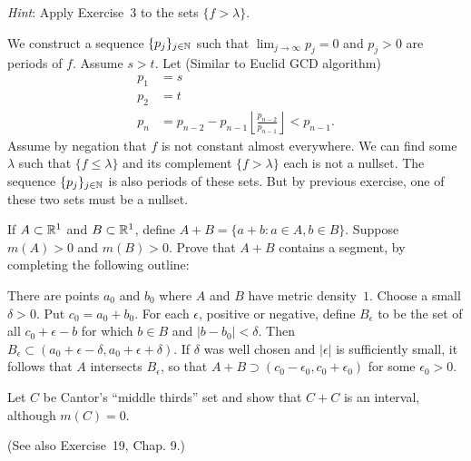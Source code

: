 \begin{enumerate}
\begin{excopy}
\emph{Hint}: Apply Exercise~3 to the sets \(\{f>\lambda\}\).
\end{excopy}

We construct a sequence \(\{p_j\}_{j\in\mathbb{N}}\) such that 
\(\lim_{j\to\infty} p_j = 0\) and \(p_j > 0\) are periods of $f$.
Assume \(s>t\). Let (Similar to Euclid GCD algorithm)
\begin{align*}
p_1 &= s \\
p_2 &= t \\
p_n &= p_{n-2} - p_{n-1}\left\lfloor \frac{p_{n-2}}{p_{n-1}}\right\rfloor
       < p_{n-1}.
\end{align*}
Assume by negation that  $f$ is not constant almost everywhere.
We can find some \(\lambda\) such that 
\(\{f\leq\lambda\}\) and its complement \(\{f>\lambda\}\)
each is not a nullset.
The sequence \(\{p_j\}_{j\in\mathbb{N}}\) is also periods of these sets.
But by previous exercise, one of these two sets must be a nullset.


\begin{excopy}
If \(A \subset \mathbb{R}^1\) and \(B \subset \mathbb{R}^1\), 
define \(A+B = \{a+b: a\in A, b\in B\}\).
Suppose \(m(A)>0\) and \(m(B)>0\).
Prove that \(A+B\) contains a segment, by completing the following outline:

There are points \(a_0\) and \(b_0\) where $A$ and $B$ have 
metric density~$1$.
Choose a small \(\delta>0\).
Put \(c_0 = a_0 + b_0\).
For each \(\epsilon\), positive or negative, define \(B_\epsilon\) 
to be the set of all \(c_0 + \epsilon - b\) for which 
\(b\in B\) and \(|b-b_0| < \delta\).
Then \(B_\epsilon \subset  (a_0 + \epsilon - \delta, a_0 + \epsilon + \delta)\).
If \(\delta\) was well chosen and \(|\epsilon|\) is sufficiently small,
it follows that $A$ intersects \(B_\epsilon\), so that 
\(A+B \supset (c_0 - \epsilon_0, c_0 + \epsilon_0)\) 
for some \(\epsilon_0 > 0\).

Let $C$ be 
Cantor's ``middle thirds'' set and show that \(C+C\) is an interval,
although \(m(C)=0\).

(See also Exercise~19, Chap. 9.)
\end{excopy}


\end{enumerate}
